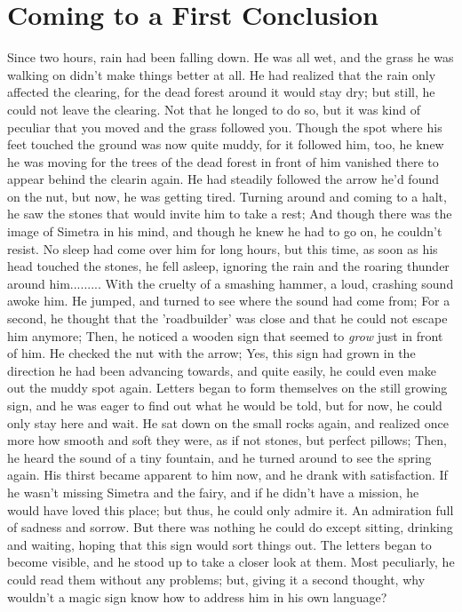\chapter{Coming to a First Conclusion}
\label{cha:coming-first-concl}
Since two hours, rain had been falling down. 
He was all wet, and the grass he was walking on didn't make things better at all. He had realized that the rain only affected the clearing, for the dead forest around it would stay dry; but still, he could not leave the clearing. Not that he longed to do so, but it was kind of peculiar that you moved and the grass followed you. Though the spot where his feet touched the ground was now quite muddy, for it followed him, too, he knew he was moving for the trees of the dead forest in front of him vanished there to appear behind the clearin again. 
He had steadily followed the arrow he'd found on the nut, but now, he was getting tired. Turning around and coming to a halt, he saw the stones that would invite him to take a rest; And though there was the image of Simetra in his mind, and though he knew he had to go on, he couldn't resist. No sleep had come over him for long hours, but this time, as soon as his head touched the stones, he fell asleep, ignoring the rain and the roaring thunder around him......... 
With the cruelty of a smashing hammer, a loud, crashing sound awoke him. 
He jumped, and turned to see where the sound had come from; For a second, he thought that the 'roadbuilder' was close and that he could not escape him anymore; Then, he noticed a wooden sign that seemed to \emph{grow} just in front of him. He checked the nut with the arrow; Yes, this sign had grown in the direction he had been advancing towards, and quite easily, he could even make out the muddy spot again. 
Letters began to form themselves on the still growing sign, and he was eager to find out what he would be told, but for now, he could only stay here and wait. 
He sat down on the small rocks again, and realized once more how smooth and soft they were, as if not stones, but perfect pillows; Then, he heard the sound of a tiny fountain, and he turned around to see the spring again. His thirst became apparent to him now, and he drank with satisfaction. 
If he wasn't missing Simetra and the fairy, and if he didn't have a mission, he would have loved this place; but thus, he could only admire it. 
An admiration full of sadness and sorrow. 
But there was nothing he could do except sitting, drinking and waiting, hoping that this sign would sort things out. 
The letters began to become visible, and he stood up to take a closer look at them. Most peculiarly, he could read them without any problems; but, giving it a second thought, why wouldn't a magic sign know how to address him in his own language? 
